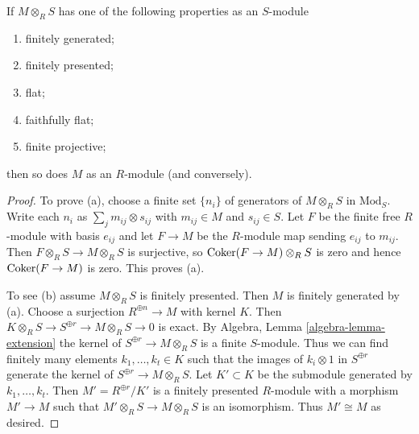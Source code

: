 \begin{theorem}
\label{theorem-descend-module-properties}
If $M \otimes_R S$ has one of the following properties as an $S$-module
\begin{enumerate}
\item[(a)]
finitely generated;
\item[(b)]
finitely presented;
\item[(c)]
flat;
\item[(d)]
faithfully flat;
\item[(e)]
finite projective;
\end{enumerate}
then so does $M$ as an $R$-module (and conversely).
\end{theorem}

\begin{proof}
To prove (a), choose a finite set $\{n_i\}$ of generators of $M \otimes_R S$
in $\text{Mod}_S$. Write each $n_i$ as $\sum_j m_{ij} \otimes s_{ij}$ with
$m_{ij} \in M$ and $s_{ij} \in S$. Let $F$ be the finite free $R$-module with
basis $e_{ij}$ and let $F \to M$ be the $R$-module map sending $e_{ij}$ to
$m_{ij}$. Then $F \otimes_R S\to M \otimes_R S$ is surjective, so
$\mathop{\mathrm{Coker}}(F \to M) \otimes_R S$ is zero and hence $\mathop{\mathrm{Coker}}(F \to M)$
is zero. This proves (a).

\medskip\noindent
To see (b) assume $M \otimes_R S$ is finitely presented. Then $M$ is finitely
generated by (a). Choose a surjection $R^{\oplus n} \to M$ with kernel $K$.
Then $K \otimes_R S \to S^{\oplus r} \to M \otimes_R S \to 0$ is exact.
By Algebra, Lemma \ref{algebra-lemma-extension}
the kernel of $S^{\oplus r} \to M \otimes_R S$
is a finite $S$-module. Thus we can find finitely many elements
$k_1, \ldots, k_t \in K$ such that the images of $k_i \otimes 1$ in
$S^{\oplus r}$ generate the kernel of $S^{\oplus r} \to M \otimes_R S$.
Let $K' \subset K$ be the submodule generated by $k_1, \ldots, k_t$.
Then $M' = R^{\oplus r}/K'$ is a finitely presented $R$-module
with a morphism $M' \to M$ such that $M' \otimes_R S \to M \otimes_R S$
is an isomorphism. Thus $M' \cong M$ as desired.


\end{proof}
